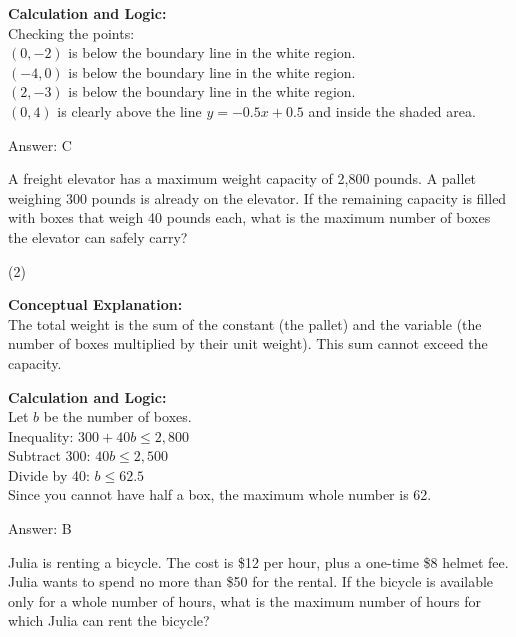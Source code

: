 \documentclass[11pt,paper=a4,answers]{exam}
\begin{document}
\begin{questions}
\begin{solution}
\vspace{10pt}
\textbf{Calculation and Logic:} \\
Checking the points: \\
$(0, -2)$ is below the boundary line in the white region. \\
$(-4, 0)$ is below the boundary line in the white region. \\
$(2, -3)$ is below the boundary line in the white region. \\
$(0, 4)$ is clearly above the line $y = -0.5x + 0.5$ and inside the shaded area.

\vspace{15pt}
Answer: \colorbox{yellow!100}{C}
\end{solution}

\question
A freight elevator has a maximum weight capacity of 2,800 pounds. A pallet weighing 300 pounds is already on the elevator. If the remaining capacity is filled with boxes that weigh 40 pounds each, what is the maximum number of boxes the elevator can safely carry?
\begin{tasks}(2)
\end{tasks}

\begin{solution}
\textbf{Conceptual Explanation:} \\
The total weight is the sum of the constant (the pallet) and the variable (the number of boxes multiplied by their unit weight). This sum cannot exceed the capacity.

\vspace{10pt}
\textbf{Calculation and Logic:} \\
Let $b$ be the number of boxes. \\
Inequality: $300 + 40b \le 2,800$ \\
Subtract 300: $40b \le 2,500$ \\
Divide by 40: $b \le 62.5$ \\
Since you cannot have half a box, the maximum whole number is 62.

\vspace{15pt}
Answer: \colorbox{yellow!100}{B}
\end{solution}

\question
Julia is renting a bicycle. The cost is \$12 per hour, plus a one-time \$8 helmet fee. Julia wants to spend no more than \$50 for the rental. If the bicycle is available only for a whole number of hours, what is the maximum number of hours for which Julia can rent the bicycle?


\end{questions}
\end{document}
